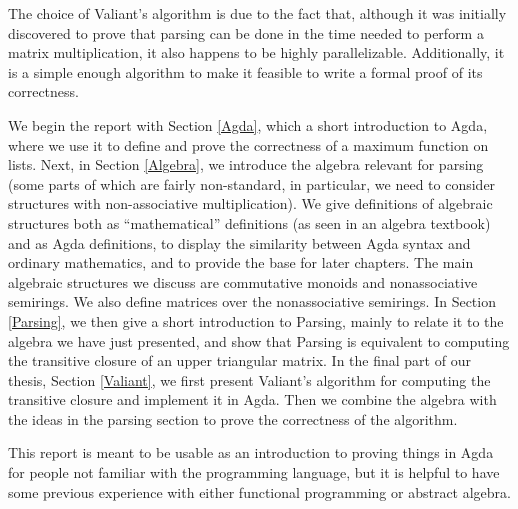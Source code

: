The choice of Valiant's algorithm is due to the fact that, although it was initially discovered to prove that parsing can be done in the time needed to perform a matrix multiplication, it also happens to be highly parallelizable. Additionally, it is a simple enough algorithm to make it feasible to write a formal proof of its correctness.



We begin the report with Section \ref{Agda}, which a short introduction to Agda, where we use it to define and prove the correctness of a maximum function on lists. Next, in Section \ref{Algebra}, we introduce the algebra relevant for parsing (some parts of which are fairly non-standard, in particular, we need to consider structures with non-associative multiplication). We give definitions of algebraic structures both as ``mathematical'' definitions (as seen in an algebra textbook) and as Agda definitions, to display the similarity between Agda syntax and ordinary mathematics, and to provide the base for later chapters. The main algebraic structures we discuss are commutative monoids and nonassociative semirings. We also define matrices over the nonassociative semirings. In Section \ref{Parsing}, we then give a short introduction to Parsing, mainly to relate it to the algebra we have just presented, and show that Parsing is equivalent to computing the transitive closure of an upper triangular matrix. In the final part of our thesis, Section \ref{Valiant}, we first present Valiant's algorithm for computing the transitive closure and implement it in Agda. Then we combine the algebra with the ideas in the parsing section to prove the correctness of the algorithm.

This report is meant to be usable as an introduction to proving things in Agda for people not familiar with the programming language, but it is helpful to have some previous experience with either functional programming or abstract algebra.
